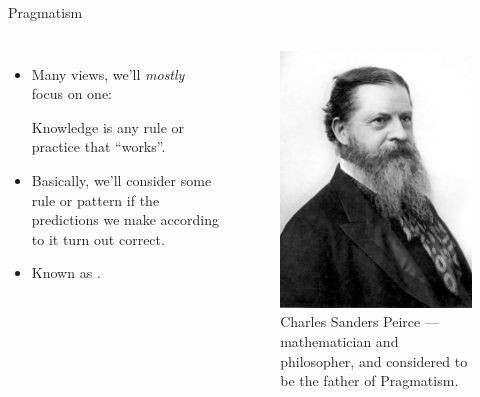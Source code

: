 \begin{frame}{Pragmatism}
    \begin{columns}[c]
        \begin{itemize}
            \item Many views, we'll \emph{mostly} focus on one:
            \begin{cquote}
                Knowledge is any rule or practice that ``works''.
            \end{cquote}
            \item Basically, we'll consider some rule or pattern  if the predictions we make according to it turn out correct.
            \item Known as .
        \end{itemize}
        \begin{figure}
                \centering
                \includegraphics[width=\columnwidth]{images/Charles_Sanders_Peirce.jpg} %
                \caption{Charles Sanders Peirce --- mathematician and philosopher, and considered to be the father of Pragmatism. }
            \end{figure}
    \end{columns}
\end{frame}

